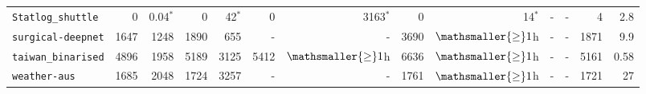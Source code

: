 \begin{tabular}{lrrrrrrrrrrrr}
\texttt{Statlog\_shuttle} & 0 & 0.04$^*$ & 0 & 42$^*$ & 0 & 3163$^*$ & 0 & 14$^*$ & - & - & 4 & 2.8\\
\texttt{surgical-deepnet} & 1647 & 1248 & 1890 & 655 & - & - & 3690 & $\mathsmaller{\geq}1$h & - & - & 1871 & 9.9\\
\texttt{taiwan\_binarised} & 4896 & 1958 & 5189 & 3125 & 5412 & $\mathsmaller{\geq}1$h & 6636 & $\mathsmaller{\geq}1$h & - & - & 5161 & 0.58\\
\texttt{weather-aus} & 1685 & 2048 & 1724 & 3257 & - & - & 1761 & $\mathsmaller{\geq}1$h & - & - & 1721 & 27\\
\bottomrule
\end{tabular}
